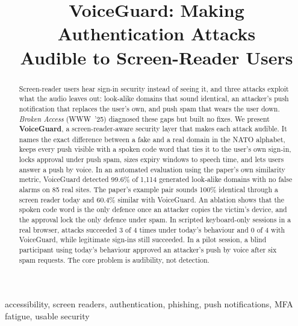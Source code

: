 \documentclass[conference]{IEEEtran}
\begin{document}
\title{VoiceGuard: Making Authentication Attacks\\Audible to Screen-Reader Users}

\author{
}

\maketitle

\begin{abstract}
Screen-reader users hear sign-in security instead of seeing it, and three attacks exploit what the audio leaves out: look-alike domains that sound identical, an attacker's push notification that replaces the user's own, and push spam that wears the user down. \emph{Broken Access} (WWW~'25) diagnosed these gaps but built no fixes. We present \textbf{VoiceGuard}, a screen-reader-aware security layer that makes each attack audible. It names the exact difference between a fake and a real domain in the NATO alphabet, keeps every push visible with a spoken code word that ties it to the user's own sign-in, locks approval under push spam, sizes expiry windows to speech time, and lets users answer a push by voice. In an automated evaluation using the paper's own similarity metric, VoiceGuard detected 99.6\% of 1,114 generated look-alike domains with no false alarms on 85 real sites. The paper's example pair sounds 100\% identical through a screen reader today and 60.4\% similar with VoiceGuard. An ablation shows that the spoken code word is the only defence once an attacker copies the victim's device, and the approval lock the only defence under spam. In scripted keyboard-only sessions in a real browser, attacks succeeded 3 of 4 times under today's behaviour and 0 of 4 with VoiceGuard, while legitimate sign-ins still succeeded. In a pilot session, a blind participant using today's behaviour approved an attacker's push by voice after six spam requests. The core problem is audibility, not detection.
\end{abstract}

\begin{IEEEkeywords}
accessibility, screen readers, authentication, phishing, push notifications, MFA fatigue, usable security
\end{IEEEkeywords}
\end{document}
